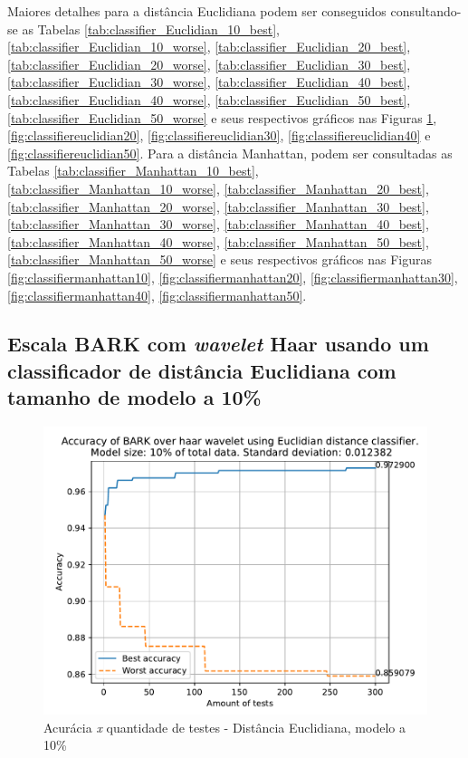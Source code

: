 		\par Maiores detalhes para a distância Euclidiana podem ser conseguidos consultando-se as Tabelas \ref{tab:classifier_Euclidian_10_best}, \ref{tab:classifier_Euclidian_10_worse},
		\ref{tab:classifier_Euclidian_20_best}, \ref{tab:classifier_Euclidian_20_worse}, 
		\ref{tab:classifier_Euclidian_30_best}, \ref{tab:classifier_Euclidian_30_worse}, 
		\ref{tab:classifier_Euclidian_40_best}, \ref{tab:classifier_Euclidian_40_worse}, 
		\ref{tab:classifier_Euclidian_50_best}, \ref{tab:classifier_Euclidian_50_worse}
		e seus respectivos gráficos nas Figuras \ref{fig:classifiereuclidian10}, \ref{fig:classifiereuclidian20}, \ref{fig:classifiereuclidian30}, \ref{fig:classifiereuclidian40} e \ref{fig:classifiereuclidian50}. Para a distância Manhattan, podem ser consultadas as Tabelas 	\ref{tab:classifier_Manhattan_10_best}, \ref{tab:classifier_Manhattan_10_worse}, 
		\ref{tab:classifier_Manhattan_20_best}, \ref{tab:classifier_Manhattan_20_worse}, 
		\ref{tab:classifier_Manhattan_30_best}, \ref{tab:classifier_Manhattan_30_worse}, 
		\ref{tab:classifier_Manhattan_40_best}, \ref{tab:classifier_Manhattan_40_worse}, 
		\ref{tab:classifier_Manhattan_50_best}, \ref{tab:classifier_Manhattan_50_worse} 
		e seus respectivos gráficos nas Figuras		 
		\ref{fig:classifiermanhattan10}, \ref{fig:classifiermanhattan20}, 	 \ref{fig:classifiermanhattan30}, \ref{fig:classifiermanhattan40},  \ref{fig:classifiermanhattan50}.
		
		
		
		\subsection{Escala BARK com \textit{wavelet} Haar usando um classificador de distância Euclidiana com tamanho de modelo a 10\%}

			
	
			\begin{figure}[!h]
				\centering
				\includegraphics[width=.6\linewidth]{images/results/confusionMatrices/classifier_Euclidian_10}
				\caption{Acurácia \textit{x} quantidade de testes - Distância Euclidiana, modelo a 10\%}
				\label{fig:classifiereuclidian10}
			\end{figure}


